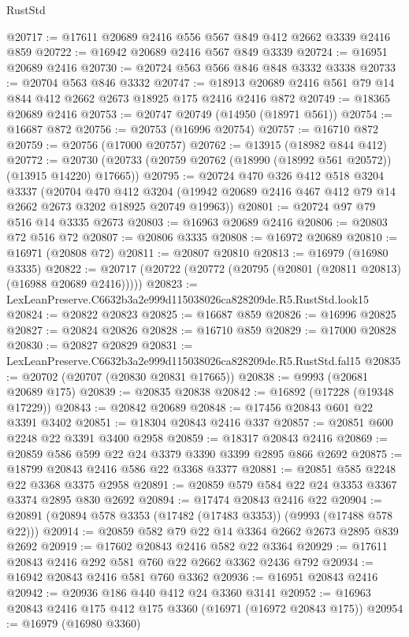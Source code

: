 \begin{lexlean}{RustStd}
\begin{coremodule}
@20717 := @17611 @20689 @2416 @556 @567 @849 @412 @2662 @3339 @2416 @859
@20722 := @16942 @20689 @2416 @567 @849 @3339
@20724 := @16951 @20689 @2416
@20730 := @20724 @563 @566 @846 @848 @3332 @3338
@20733 := @20704 @563 @846 @3332
@20747 := @18913 @20689 @2416 @561 @79 @14 @844 @412 @2662 @2673 @18925 @175 @2416 @2416 @872
@20749 := @18365 @20689 @2416
@20753 := @20747 @20749 (@14950 (@18971 @561))
@20754 := @16687 @872
@20756 := @20753 (@16996 @20754)
@20757 := @16710 @872
@20759 := @20756 (@17000 @20757)
@20762 := @13915 (@18982 @844 @412)
@20772 := @20730 (@20733 (@20759 @20762 (@18990 (@18992 @561 @20572)) (@13915 @14220) @17665))
@20795 := @20724
    @470
    @326
    @412
    @518
    @3204
    @3337
    (@20704
      @470
      @412
      @3204
      (@19942 @20689 @2416 @467 @412 @79 @14 @2662 @2673 @3202 @18925 @20749 @19963))
@20801 := @20724 @97 @79 @516 @14 @3335 @2673
@20803 := @16963 @20689 @2416
@20806 := @20803 @72 @516 @72
@20807 := @20806 @3335
@20808 := @16972 @20689
@20810 := @16971 (@20808 @72)
@20811 := @20807 @20810
@20813 := @16979 (@16980 @3335)
@20822 := @20717 (@20722 (@20772 (@20795 (@20801 (@20811 @20813) (@16988 @20689 @2416)))))
@20823 := LexLeanPreserve.C6632b3a2e999d115038026ca828209de.R5.RustStd.look15
@20824 := @20822 @20823
@20825 := @16687 @859
@20826 := @16996 @20825
@20827 := @20824 @20826
@20828 := @16710 @859
@20829 := @17000 @20828
@20830 := @20827 @20829
@20831 := LexLeanPreserve.C6632b3a2e999d115038026ca828209de.R5.RustStd.fal15
@20835 := @20702 (@20707 (@20830 @20831 @17665))
@20838 := @9993 (@20681 @20689 @175)
@20839 := @20835 @20838
@20842 := @16892 (@17228 (@19348 @17229))
@20843 := @20842 @20689
@20848 := @17456 @20843 @601 @22 @3391 @3402
@20851 := @18304 @20843 @2416 @337
@20857 := @20851 @600 @2248 @22 @3391 @3400 @2958
@20859 := @18317 @20843 @2416
@20869 := @20859 @586 @599 @22 @24 @3379 @3390 @3399 @2895 @866 @2692
@20875 := @18799 @20843 @2416 @586 @22 @3368 @3377
@20881 := @20851 @585 @2248 @22 @3368 @3375 @2958
@20891 := @20859 @579 @584 @22 @24 @3353 @3367 @3374 @2895 @830 @2692
@20894 := @17474 @20843 @2416 @22
@20904 := @20891 (@20894 @578 @3353 (@17482 (@17483 @3353)) (@9993 (@17488 @578 @22)))
@20914 := @20859 @582 @79 @22 @14 @3364 @2662 @2673 @2895 @839 @2692
@20919 := @17602 @20843 @2416 @582 @22 @3364
@20929 := @17611 @20843 @2416 @292 @581 @760 @22 @2662 @3362 @2436 @792
@20934 := @16942 @20843 @2416 @581 @760 @3362
@20936 := @16951 @20843 @2416
@20942 := @20936 @186 @440 @412 @24 @3360 @3141
@20952 := @16963 @20843 @2416 @175 @412 @175 @3360 (@16971 (@16972 @20843 @175))
@20954 := @16979 (@16980 @3360)

\end{coremodule}
\end{lexlean}
